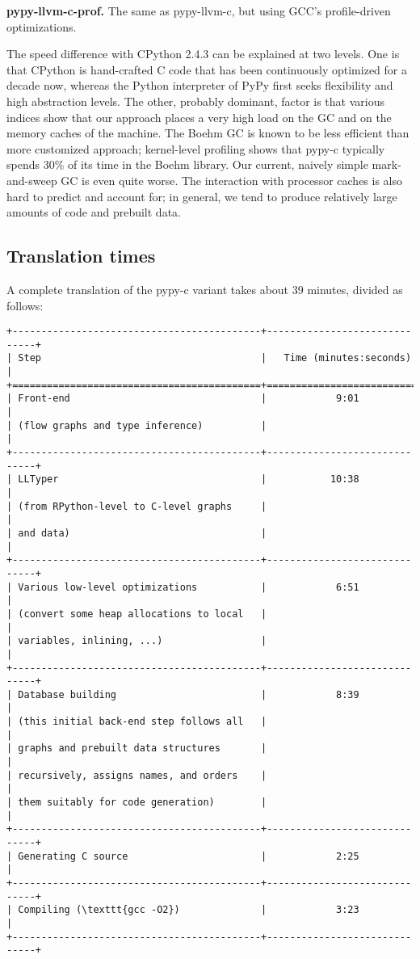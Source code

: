 \documentclass{acm_proc_article-sp}
\begin{document}
{\bf pypy-llvm-c-prof.}
    The same as pypy-llvm-c, but using GCC's profile-driven
    optimizations.

The speed difference with CPython 2.4.3 can be explained at two levels.
One is that CPython is hand-crafted C code that has been continuously
optimized for a decade now, whereas the Python interpreter of PyPy first
seeks flexibility and high abstraction levels.  The other, probably
dominant, factor is that various indices show that our approach places a
very high load on the GC and on the memory caches of the machine.  The
Boehm GC is known to be less efficient than more customized approach;
kernel-level profiling shows that pypy-c typically spends 30\% of its
time in the Boehm library.  Our current, naively simple mark-and-sweep
GC is even quite worse.  The interaction with processor caches is also
hard to predict and account for; in general, we tend to produce
relatively large amounts of code and prebuilt data.


\subsection{Translation times}

A complete translation of the pypy-c variant takes about 39 minutes,
divided as follows:

\begin{verbatim}
+-------------------------------------------+------------------------------+
| Step                                      |   Time (minutes:seconds)     |
+===========================================+==============================+
| Front-end                                 |            9:01              |
| (flow graphs and type inference)          |                              |
+-------------------------------------------+------------------------------+
| LLTyper                                   |           10:38              |
| (from RPython-level to C-level graphs     |                              |
| and data)                                 |                              |
+-------------------------------------------+------------------------------+
| Various low-level optimizations           |            6:51              |
| (convert some heap allocations to local   |                              |
| variables, inlining, ...)                 |                              |
+-------------------------------------------+------------------------------+
| Database building                         |            8:39              |
| (this initial back-end step follows all   |                              |
| graphs and prebuilt data structures       |                              |
| recursively, assigns names, and orders    |                              |
| them suitably for code generation)        |                              |
+-------------------------------------------+------------------------------+
| Generating C source                       |            2:25              |
+-------------------------------------------+------------------------------+
| Compiling (\texttt{gcc -O2})              |            3:23              |
+-------------------------------------------+------------------------------+
\end{verbatim}
\end{document}
